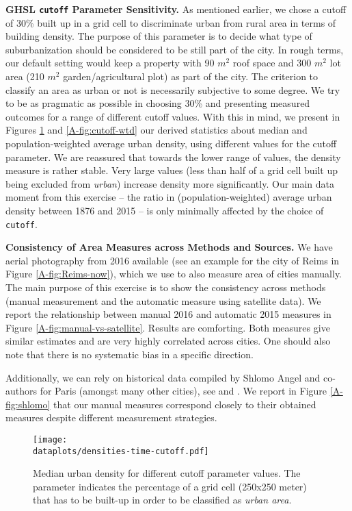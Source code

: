 \documentclass[11pt]{report}
\newcommand{\dataplots}{../../output/data/plots}
\begin{document}
\textbf{GHSL \texttt{cutoff} Parameter Sensitivity.}\label{A-sec:cutoff-sens} As mentioned earlier, we chose a cutoff of 30\% built up in a grid cell to discriminate urban from rural area in terms of building density. The purpose of this parameter is to decide what type of suburbanization should be considered to be still part of the city. In rough terms, our default setting would keep a property with 90 $m^2$ roof space and 300 $m^2$ lot area (210 $m^2$ garden/agricultural plot) as part of the city. The criterion to classify an area as urban or not is necessarily subjective to some degree. We try to be as pragmatic as possible in choosing 30\% and presenting measured outcomes for a range of different cutoff values. With this in mind, we present in Figures \ref{A-fig:cutoff} and \ref{A-fig:cutoff-wtd} our derived statistics about median and population-weighted average urban density, using different values for the cutoff parameter. We are reassured that towards the lower range of values, the density measure is rather stable. Very large values (less than half of a grid cell built up being excluded from \emph{urban}) increase density more significantly. Our main data moment from this exercise -- the ratio in (population-weighted) average urban density between 1876 and 2015 -- is only minimally affected by the choice of \texttt{cutoff}.

\textbf{Consistency of Area Measures across Methods and Sources.} We have aerial photography from 2016 available (see an example for the city of Reims in Figure \ref{A-fig:Reims-now}), which we use to also measure area of cities manually. The main purpose of this exercise is to show the consistency across methods (manual measurement and the automatic measure using satellite data). We report the relationship between manual 2016 and automatic 2015 measures in Figure \ref{A-fig:manual-vs-satellite}. Results are comforting. Both measures give similar estimates and are very highly correlated across cities. One should also note that there is no systematic bias in a specific direction.

Additionally, we can rely on historical data compiled by Shlomo Angel and co-authors for Paris (amongst many other cities), see \cite{angel2012atlas} and \cite{angel2010persistent}. We 
report in Figure \ref{A-fig:shlomo} that our manual measures correspond closely to their obtained measures despite different measurement strategies. 

\begin{figure}[p]
	\texttt{[image: \\dataplots/densities-time-cutoff.pdf]}
	\caption{Median urban density for different cutoff parameter values. The parameter indicates the percentage of a grid cell (250x250 meter) that has to be built-up in order to be classified as \emph{urban area}. \label{A-fig:cutoff}}
\end{figure}
\end{document}
